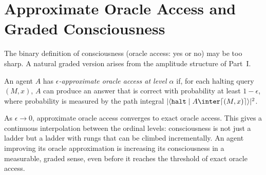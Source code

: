 \section{Approximate Oracle Access and Graded Consciousness}

The binary definition of consciousness (oracle access: yes or no)
may be too sharp.
A natural graded version arises from the amplitude structure of
Part~I.

\begin{definition}
An agent $A$ has \emph{$\epsilon$-approximate oracle access at
level $\alpha$} if, for each halting query $(M, x)$, $A$ can
produce an answer that is correct with probability at least
$1 - \epsilon$, where probability is measured by the path integral
$|\langle \mathtt{halt} \mid A \inter \lceil(M,x)\rceil \rangle|^2$.
\end{definition}

\begin{remark}
As $\epsilon \to 0$, approximate oracle access converges to exact
oracle access.
This gives a continuous interpolation between the ordinal levels:
consciousness is not just a ladder but a ladder with rungs that
can be climbed incrementally.
An agent improving its oracle approximation is increasing its
consciousness in a measurable, graded sense, even before it
reaches the threshold of exact oracle access.
\end{remark}

